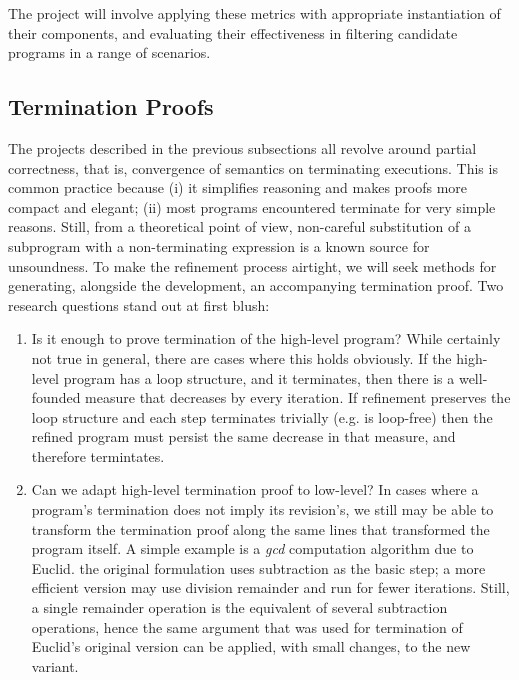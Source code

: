 The project will involve applying these metrics with appropriate 
instantiation of their components, and evaluating their effectiveness
in filtering candidate programs in a range of scenarios.

\subsection{Termination Proofs}

The projects described in the previous subsections all revolve around partial
correctness, that is, convergence of semantics on terminating executions.
This is common practice because
(i) it simplifies reasoning and makes proofs more compact and elegant;
(ii) most programs encountered terminate for very simple reasons.
Still, from a theoretical point of view, non-careful substitution of a subprogram
with a non-terminating expression is a known source for unsoundness.
To make the refinement process airtight, we will seek methods for generating,
alongside the development, an accompanying termination proof.
Two research questions stand out at first blush:

\begin{enumerate}
  \item Is it enough to prove termination of the high-level program?
    While certainly not true in general, there are cases where this holds
    obviously. If the high-level program has a loop structure, and it terminates,
    then there is a well-founded measure that decreases by every iteration.
    If refinement preserves the loop structure and each step terminates trivially
    (e.g.  is loop-free) then the refined program must persist the same
    decrease in that measure, and therefore termintates.
  \item Can we adapt high-level termination proof to low-level?
    In cases where a program's termination does not imply its revision's,
    we still may be able to transform the termination proof along the same
    lines that transformed the program itself.
    A simple example is a \textit{gcd} computation algorithm due to Euclid.
    the original formulation uses subtraction as the basic step;
    a more efficient version may use division remainder and run for fewer
    iterations.
    Still, a single remainder operation is the equivalent of several subtraction
    operations, hence the same argument that was used for termination of
    Euclid's original version can be applied, with small changes, to the new variant.
\end{enumerate}
